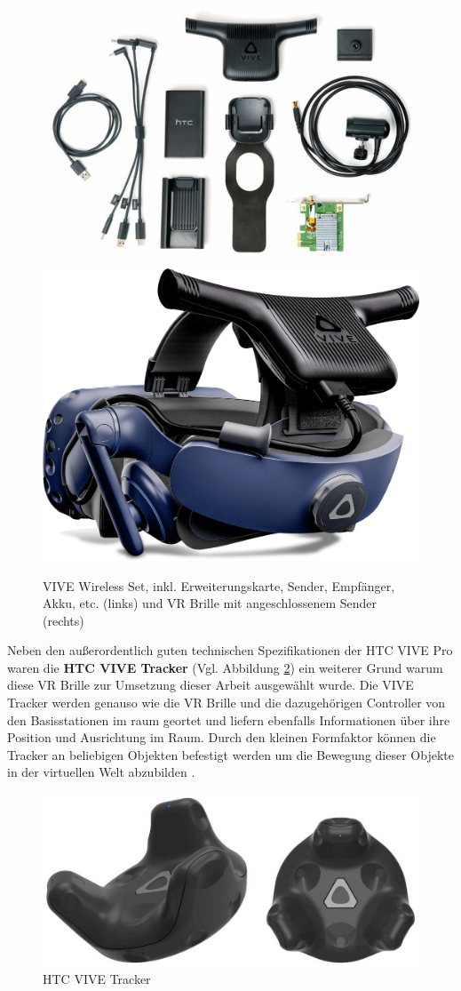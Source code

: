 \begin{figure}[h]
	\centering
	\includegraphics[width=0.5\linewidth]{Bilder/A27_WirelessKit}
	\includegraphics[width=0.4\linewidth]{Bilder/A28_Vive+Wireless}
	\caption{VIVE Wireless Set, inkl. Erweiterungskarte, Sender, Empfänger, Akku, etc. (links) \cite{A27} und VR Brille mit angeschlossenem Sender (rechts) \cite{A28}}
	\label{fig:WirelessKit}
\end{figure}
Neben den außerordentlich guten technischen Spezifikationen der HTC VIVE Pro waren die \textbf{HTC VIVE Tracker} (Vgl. Abbildung \ref{fig:ViveTracker}) ein weiterer Grund warum diese VR Brille zur Umsetzung dieser Arbeit ausgewählt wurde. Die VIVE Tracker werden genauso wie die VR Brille und die dazugehörigen Controller von den Basisstationen im raum geortet und liefern ebenfalls Informationen über ihre Position und Ausrichtung im Raum. Durch den kleinen Formfaktor können die Tracker an beliebigen Objekten befestigt werden um die Bewegung dieser Objekte in der virtuellen Welt abzubilden \cite{30}.
\newline
\begin{figure}[h]
	\centering
	\includegraphics[width=0.6\linewidth]{Bilder/A29_ViveTracker}
	\caption{HTC VIVE Tracker \cite{A29}}
	\label{fig:ViveTracker}
\end{figure}
